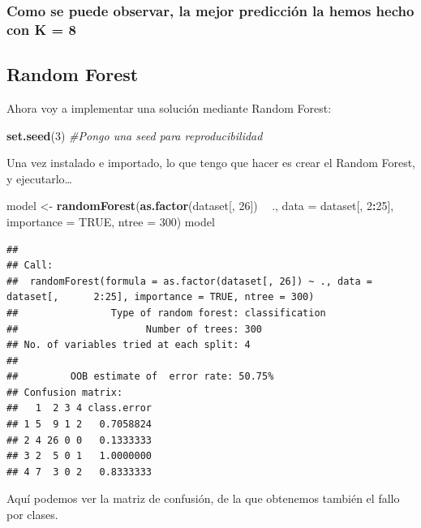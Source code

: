\documentclass[]{article}
\newenvironment{Shaded}{\begin{snugshade}}{\end{snugshade}}
\newcommand{\KeywordTok}[1]{\textcolor[rgb]{0.13,0.29,0.53}{\textbf{#1}}}
\newcommand{\DataTypeTok}[1]{\textcolor[rgb]{0.13,0.29,0.53}{#1}}
\newcommand{\DecValTok}[1]{\textcolor[rgb]{0.00,0.00,0.81}{#1}}
\newcommand{\StringTok}[1]{\textcolor[rgb]{0.31,0.60,0.02}{#1}}
\newcommand{\CommentTok}[1]{\textcolor[rgb]{0.56,0.35,0.01}{\textit{#1}}}
\newcommand{\OtherTok}[1]{\textcolor[rgb]{0.56,0.35,0.01}{#1}}
\newcommand{\OperatorTok}[1]{\textcolor[rgb]{0.81,0.36,0.00}{\textbf{#1}}}
\newcommand{\NormalTok}[1]{#1}
\begin{document}
\subsubsection{Como se puede observar, la mejor predicción la hemos
hecho con K =
8}\label{como-se-puede-observar-la-mejor-prediccion-la-hemos-hecho-con-k-8}

\subsection{Random Forest}\label{random-forest}

Ahora voy a implementar una solución mediante Random Forest:

\begin{Shaded}
\begin{Highlighting}[]
\KeywordTok{set.seed}\NormalTok{(}\DecValTok{3}\NormalTok{) }\CommentTok{#Pongo una seed para reproducibilidad}
\end{Highlighting}
\end{Shaded}

Una vez instalado e importado, lo que tengo que hacer es crear el Random
Forest, y ejecutarlo\ldots{}

\begin{Shaded}
\begin{Highlighting}[]
\NormalTok{model <-}\StringTok{ }\KeywordTok{randomForest}\NormalTok{(}\KeywordTok{as.factor}\NormalTok{(dataset[, }\DecValTok{26}\NormalTok{]) }\OperatorTok{~}\StringTok{ }\NormalTok{., }\DataTypeTok{data =}\NormalTok{ dataset[, }\DecValTok{2}\OperatorTok{:}\DecValTok{25}\NormalTok{], }\DataTypeTok{importance =} \OtherTok{TRUE}\NormalTok{, }\DataTypeTok{ntree =} \DecValTok{300}\NormalTok{)}
\NormalTok{model}
\end{Highlighting}
\end{Shaded}

\begin{verbatim}
## 
## Call:
##  randomForest(formula = as.factor(dataset[, 26]) ~ ., data = dataset[,      2:25], importance = TRUE, ntree = 300) 
##                Type of random forest: classification
##                      Number of trees: 300
## No. of variables tried at each split: 4
## 
##         OOB estimate of  error rate: 50.75%
## Confusion matrix:
##   1  2 3 4 class.error
## 1 5  9 1 2   0.7058824
## 2 4 26 0 0   0.1333333
## 3 2  5 0 1   1.0000000
## 4 7  3 0 2   0.8333333
\end{verbatim}

Aquí podemos ver la matriz de confusión, de la que obtenemos también el
fallo por clases.
\end{document}
